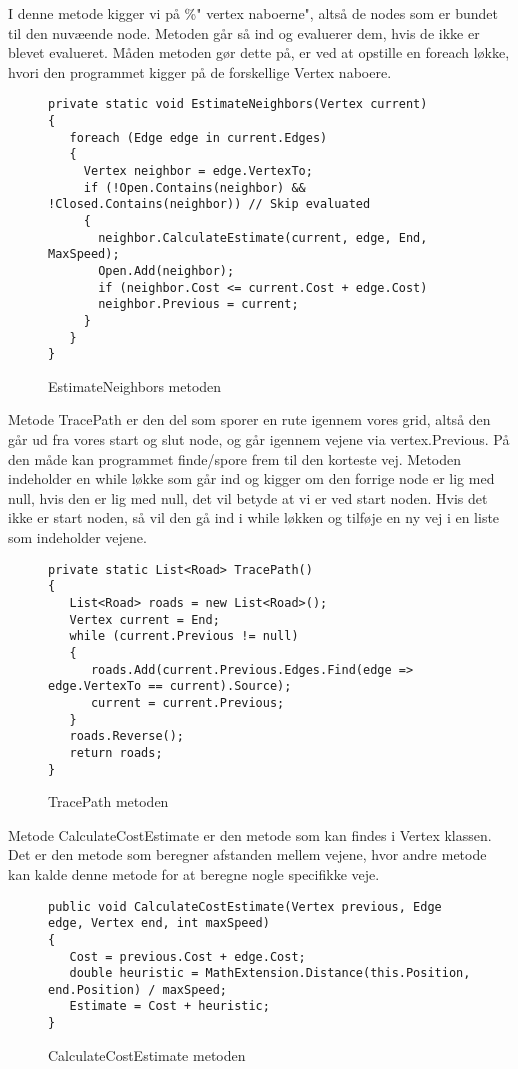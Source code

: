 I denne metode kigger vi på \%" vertex naboerne", altså de nodes som er bundet til den nuvæende node. Metoden går så ind og evaluerer dem, hvis de ikke er blevet evalueret. Måden metoden gør dette på, er ved at opstille en foreach løkke, hvori den programmet kigger på de forskellige Vertex naboere. 
\begin{figure}[H]
\begin{lstlisting}
private static void EstimateNeighbors(Vertex current)
{
   foreach (Edge edge in current.Edges)
   {
     Vertex neighbor = edge.VertexTo;
     if (!Open.Contains(neighbor) && !Closed.Contains(neighbor)) // Skip evaluated
     {
       neighbor.CalculateEstimate(current, edge, End, MaxSpeed); 
       Open.Add(neighbor);
       if (neighbor.Cost <= current.Cost + edge.Cost) 
       neighbor.Previous = current;
     }
   }
}
\end{lstlisting}
\caption{EstimateNeighbors metoden}\label{EstimateNeighborsCode}
\end{figure}

\vspace{5mm}

Metode TracePath er den del som sporer en rute igennem vores grid, altså den går ud fra vores start og slut node, og går igennem vejene via vertex.Previous. På den måde kan programmet finde/spore frem til den korteste vej. Metoden indeholder en while løkke som går ind og kigger om den forrige node er lig med null, hvis den er lig med null, det vil betyde at vi er ved start noden. Hvis det ikke er start noden, så vil den gå ind i while løkken og tilføje en ny vej i en liste som indeholder vejene.
\begin{figure}[H]
\begin{lstlisting}
private static List<Road> TracePath()
{
   List<Road> roads = new List<Road>();
   Vertex current = End;
   while (current.Previous != null)              
   { 
      roads.Add(current.Previous.Edges.Find(edge => edge.VertexTo == current).Source);
      current = current.Previous;
   }
   roads.Reverse();
   return roads;
}
\end{lstlisting}
\caption{TracePath metoden}\label{TracePathCode}
\end{figure}


\vspace{5mm}

Metode CalculateCostEstimate er den metode som kan findes i Vertex klassen. Det er den metode som beregner afstanden mellem vejene, hvor andre metode kan kalde denne metode for at beregne nogle specifikke veje. 
\begin{figure}[H]
\begin{lstlisting}
public void CalculateCostEstimate(Vertex previous, Edge edge, Vertex end, int maxSpeed)
{
   Cost = previous.Cost + edge.Cost;
   double heuristic = MathExtension.Distance(this.Position, end.Position) / maxSpeed;
   Estimate = Cost + heuristic;
}
\end{lstlisting}
\caption{CalculateCostEstimate metoden}\label{CalculateCostEstimateCode}
\end{figure}



